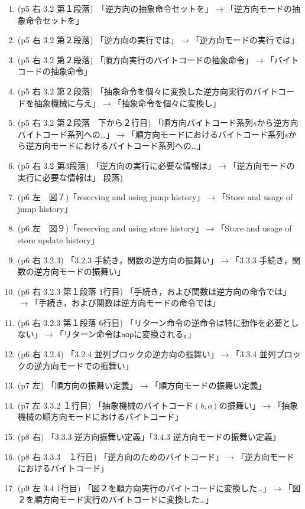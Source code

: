 \documentclass[a4j]{jarticle}
\begin{document}
\begin{enumerate}
\item (p5 右 3.2 第１段落)　「逆方向の抽象命令セットを」$\rightarrow$「逆方向モードの抽象命令セットを」 
\item (p5 右 3.2 第２段落)   「逆方向の実行では」$\rightarrow$「逆方向モードの実行では」
\item (p5 右 3.2 第２段落)  「順方向実行のバイトコードの抽象命令」$\rightarrow$「バイトコードの抽象命令」
\item (p5 右 3.2 第２段落)   「抽象命令を個々に変換した逆方向実行のバイトコードを抽象機械に与え」$\rightarrow$「抽象命令を個々に変換し」
\item (p5 右 3.2 第２段落　下から２行目) 「順方向バイトコード系列$s$から逆方向バイトコード系列への…」$\rightarrow$「順方向モードにおけるバイトコード系列$s$から逆方向モードにおけるバイトコード系列への…」
\item (p5 右 3.2 第3段落) 「逆方向の実行に必要な情報は」$\rightarrow$「逆方向モードの実行に必要な情報は」
段落)   
\item (p6 左　図７)「reserving and using jump history」$\rightarrow$「Store and usage of jump history」
\item (p6 左　図９)「reserving and using store history」$\rightarrow$「Store and usage of store update history」
\item (p6 右 3.2.3) 「3.2.3 手続き，関数の逆方向の振舞い」$\rightarrow$「3.3.3 手続き，関数の逆方向モードの振舞い」
\item (p6 右 3.2.3 第１段落 1行目) 「手続き，および関数は逆方向の命令では」$\rightarrow$「手続き，および関数は逆方向モードの命令では」
\item (p6 右 3.2.3 第１段落 6行目) 「リターン命令の逆命令は特に動作を必要としない」$\rightarrow$「リターン命令は$\mathsf{nop}$に変換される。」
\item (p6 右 3.2.4) 「3.2.4 並列ブロックの逆方向の振舞い」$\rightarrow$「3.3.4 並列ブロックの逆方向モードでの振舞い」
\item (p7 左) 「順方向の振舞い定義」$\rightarrow$「順方向モードの振舞い定義」
\item (p7 左 3.3.2 １行目)  「抽象機械のバイトコード$(b,o)$の振舞い」$\rightarrow$「抽象機械の順方向モードにおけるバイトコード」
\item (p8 右) 「3.3.3 逆方向振舞い定義」「3.4.3 逆方向モードの振舞い定義」
\item (p8 右 3.3.3　１行目) 「逆方向のためのバイトコード」$\rightarrow$「逆方向モードにおけるバイトコード」
\item (p9 左 3.4 1行目) 「図２を順方向実行のバイトコードに変換した…」$\rightarrow$「図２を順方向モード実行のバイトコードに変換した…」

\end{enumerate}
\end{document}

